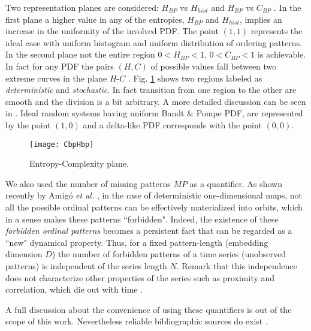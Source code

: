 Two representation planes are considered: $H_{BP}$ vs $H_{hist}$ \cite{DeMicco2008} and $H_{BP}$ vs $C_{BP}$ \cite{Rosso2007C}.
In the first plane a higher value in any of the entropies, $H_{BP}$ and $H_{hist}$, implies an increase in the uniformity of the involved PDF.
The point $(1,1)$ represents the ideal case with uniform histogram and uniform distribution of ordering patterns.
In the second plane not the entire region $0<H_{BP}<1$, $0<C_{BP}<1$ is achievable.
In fact for any PDF the pairs $(H,C)$ of possible values fall between two extreme curves in the plane $H$-$C$ \cite{Anteneodo1996}.
Fig. \ref{fig:CbpHbp} shows two regions labeled as \textit{deterministic} and \textit{stochastic}.
In fact transition from one region to the other are smooth and the division is a bit arbitrary.
A more detailed discussion can be seen in \cite{Rosso2007C}.
Ideal random systems having uniform Bandt \& Pompe PDF, are represented by the point $(1,0)$ \cite{Gonzalez2005} and a delta-like PDF corresponds with the point $(0,0)$.

\begin{figure}
	\texttt{[image: CbpHbp]}
	\caption{Entropy-Complexity plane.}
	\label{fig:CbpHbp}
\end{figure}

We also used the number of missing patterns $MP$ as a quantifier\cite{Rosso2012}.
As shown recently by Amig\'o {\it et al.} \cite{Amigo2006,Amigo2007,Amigo2008,Amigo2010}, in the case of deterministic one-dimensional maps, not all the possible ordinal patterns can be effectively materialized into orbits, which in a sense makes these patterns ``forbidden".
Indeed, the existence of these {\it forbidden ordinal patterns} becomes a persistent fact that can be regarded as a ``new" dynamical property.
Thus, for a fixed pattern-length (embedding dimension $D$) the number of forbidden patterns of a time series (unobserved patterns) is independent of the series length $N$.
Remark that this independence does not characterize other properties of the series such as proximity and correlation, which die out with time \cite{Amigo2007,Amigo2010}.

A full discussion about the convenience of using these quantifiers is out of the scope of this work.
Nevertheless reliable bibliographic sources do exist \cite{Wackerbauer1994,Lopez1995,Rosso2007A,DeMicco2008,Rosso2009,Martin2006,Rosso2012}.